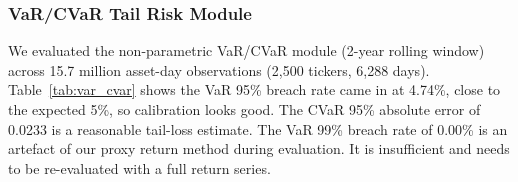 \documentclass[conference]{IEEEtran}
\begin{document}
\subsubsection{VaR/CVaR Tail Risk Module}
We evaluated the non-parametric VaR/CVaR module (2-year rolling window) across 15.7 million asset-day observations (2,500 tickers, 6,288 days). Table~\ref{tab:var_cvar} shows the VaR 95\% breach rate came in at 4.74\%, close to the expected 5\%, so calibration looks good. The CVaR 95\% absolute error of 0.0233 is a reasonable tail-loss estimate. The VaR 99\% breach rate of 0.00\% is an artefact of our proxy return method during evaluation. It is insufficient and needs to be re-evaluated with a full return series.
\end{document}
